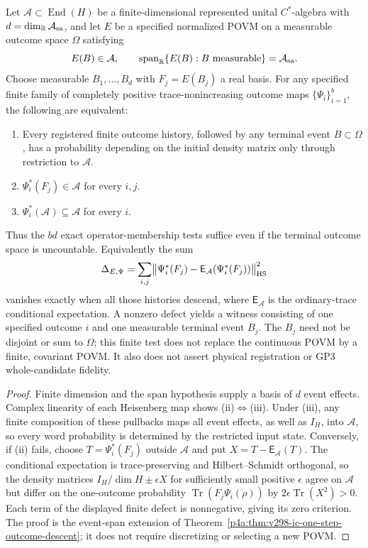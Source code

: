 \documentclass[12pt,a4paper]{article}
\begin{document}
\begin{theorem}
\label{p4a:thm:v299-continuous-ic-event-test}
Let $\mathcal A\subset\operatorname{End}(H)$ be a finite-dimensional
represented unital $C^*$-algebra with
$d=\dim_{\mathbb R}\mathcal A_{\rm sa}$, and let $E$ be a specified
normalized POVM on a measurable outcome space $\Omega$ satisfying
\[
 E(B)\in\mathcal A,\qquad
 \operatorname{span}_{\mathbb R}\{E(B):B\ \mathrm{measurable}\}
 =\mathcal A_{\rm sa}.
\]
Choose measurable $B_1,\ldots,B_d$ with
$F_j=E(B_j)$ a real basis. For any specified finite family of
completely positive trace-nonincreasing outcome maps
$\{\Psi_i\}_{i=1}^b$, the following are equivalent:
\begin{enumerate}[label=(\roman*),leftmargin=2em]
\item Every registered finite outcome history, followed by any
terminal event $B\subset\Omega$, has a probability depending on
the initial density matrix only through restriction to $\mathcal A$.
\item $\Psi_i^*(F_j)\in\mathcal A$ for every $i,j$.
\item $\Psi_i^*(\mathcal A)\subseteq\mathcal A$ for every $i$.
\end{enumerate}
Thus the $bd$ exact operator-membership tests suffice even if the
terminal outcome space is uncountable. Equivalently the sum
\[
 \Delta_{E,\Psi}=\sum_{i,j}\bigl\|\Psi_i^*(F_j)-
 \mathsf E_{\mathcal A}(\Psi_i^*(F_j))\bigr\|_{\rm HS}^{2}
\]
vanishes exactly when all those histories descend, where
$\mathsf E_{\mathcal A}$ is the ordinary-trace conditional
expectation. A nonzero defect yields a witness consisting of one
specified outcome $i$ and one measurable terminal event $B_j$.
The $B_j$ need not be disjoint or sum to $\Omega$; this finite test
does not replace the continuous POVM by a finite, covariant POVM.
It also does not assert physical registration or GP3 whole-candidate
fidelity.
\end{theorem}
\begin{proof}
Finite dimension and the span hypothesis supply a basis of $d$
event effects. Complex linearity of each Heisenberg map shows
(ii)$\Leftrightarrow$(iii). Under (iii), any finite composition of
these pullbacks maps all event effects, as well as $I_H$, into
$\mathcal A$, so every word probability is determined by the
restricted input state. Conversely, if (ii) fails, choose
$T=\Psi_i^*(F_j)$ outside $\mathcal A$ and put
$X=T-\mathsf E_{\mathcal A}(T)$. The conditional expectation is
trace-preserving and Hilbert--Schmidt orthogonal, so the density
matrices $I_H/\dim H\pm\epsilon X$ for sufficiently small positive
$\epsilon$ agree on $\mathcal A$ but differ on the one-outcome
probability $\operatorname{Tr}(F_j\Psi_i(\rho))$ by
$2\epsilon\operatorname{Tr}(X^2)>0$. Each term of the displayed
finite defect is nonnegative, giving its zero criterion. The
proof is the event-span extension of
Theorem~\ref{p4a:thm:v298-ic-one-step-outcome-descent}; it does
not require discretizing or selecting a new POVM.
\end{proof}
\end{document}
